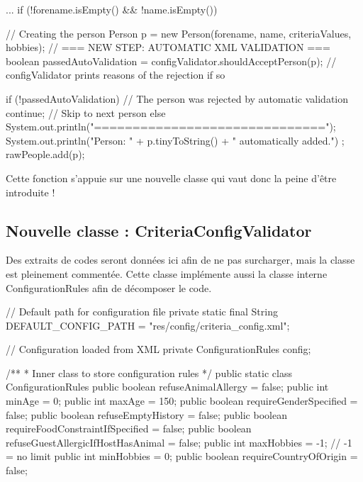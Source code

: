 \documentclass{mytex}
\begin{document}
\begin{codebox}
...
if (!forename.isEmpty() && !name.isEmpty()) {
	// Creating the person
	Person p = new Person(forename, name, criteriaValues, hobbies);
	// === NEW STEP: AUTOMATIC XML VALIDATION ===
	boolean passedAutoValidation = configValidator.shouldAcceptPerson(p);
	// configValidator prints reasons of the rejection if so
	
	if (!passedAutoValidation) {
		// The person was rejected by automatic validation
		continue; // Skip to next person
	} else {
		System.out.println("\n==============================\n");
		System.out.println("Person: " + p.tinyToString() + " automatically added.") ;
		rawPeople.add(p);
	}
}
\end{codebox}

Cette fonction s'appuie sur une nouvelle classe qui vaut donc la peine d'être introduite !

\subsection{Nouvelle classe : CriteriaConfigValidator}

Des extraits de codes seront données ici afin de ne pas surcharger, mais la classe est pleinement commentée. Cette classe implémente aussi la classe interne ConfigurationRules afin de décomposer le code. 


\begin{codebox}
// Default path for configuration file
private static final String DEFAULT_CONFIG_PATH = "res/config/criteria_config.xml";

// Configuration loaded from XML
private ConfigurationRules config;    	
\end{codebox}


\begin{codebox}
/**
* Inner class to store configuration rules
*/
public static class ConfigurationRules {
	public boolean refuseAnimalAllergy = false;
	public int minAge = 0;
	public int maxAge = 150;
	public boolean requireGenderSpecified = false;
	public boolean refuseEmptyHistory = false;
	public boolean requireFoodConstraintIfSpecified = false;
	public boolean refuseGuestAllergicIfHostHasAnimal = false;
	public int maxHobbies = -1; // -1 = no limit
	public int minHobbies = 0;
	public boolean requireCountryOfOrigin = false;
}
\end{codebox}
\end{document}
